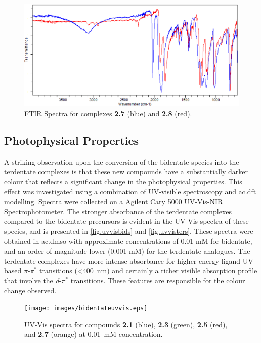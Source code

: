 \begin{figure}[!htb]
 \centering
 \includegraphics[clip=true, width=\textwidth, keepaspectratio]{images/ftir7and8.eps}
 \caption[FTIR Spectra for complexes \textbf{2.7} and \textbf{2.8}.]{FTIR Spectra for complexes \textbf{2.7} (blue) and \textbf{2.8} (red).}
 \label{fig.ir78}
\end{figure}

\FloatBarrier
\subsection{Photophysical Properties}

A striking observation upon the conversion of the bidentate species into the terdentate complexes is that these new compounds have a substantially darker colour that reflects a significant change in the photophysical properties. This effect was investigated using a combination of UV-visible spectroscopy and \gls{ac.dft} modelling. Spectra were collected on a Agilent Cary 5000 UV-Vis-NIR Spectrophotometer. The stronger absorbance of the terdentate complexes compared to the bidentate precursors is evident in the UV-Vis spectra of these species, and is presented in \autoref{fig.uvvisbids} and \autoref{fig.uvvisters}. These spectra were obtained in \gls{ac.dmso} with approximate concentrations of 0.01 mM for bidentate, and an order of magnitude lower (0.001 mM) for the terdentate analogues. The terdentate complexes have more intense absorbance for higher energy ligand UV-based $\pi$-$\pi^\ast$ transitions (\textless 400~nm) and certainly a richer visible absorption profile that involve the \textit{d}-$\pi^\ast$ transitions. These features are responsible for the colour change observed.

\begin{figure}[!htb]
\centering
 \texttt{[image: images/bidentateuvvis.eps]}
 \caption[UV-Vis spectra for compounds \textbf{2.1}, \textbf{2.3}, \textbf{2.5}, and \textbf{2.7}.]{UV-Vis spectra for compounds \textbf{2.1} (blue), \textbf{2.3} (green), \textbf{2.5} (red), and \textbf{2.7} (orange) at 0.01~mM concentration.}
 \label{fig.uvvisbids}
\end{figure}


